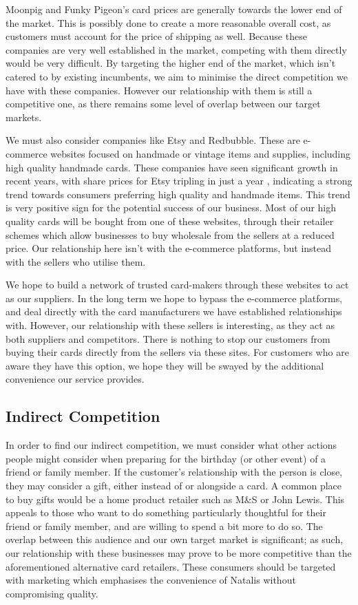 \documentclass[10pt,a4paper]{article}
\begin{document}
Moonpig and Funky Pigeon's card prices are generally towards the lower end of the market. This is possibly done to create a more reasonable overall cost, as customers must account for the price of shipping as well. Because these companies are very well established in the market, competing with them directly would be very difficult. By targeting the higher end of the market, which isn't catered to by existing incumbents, we aim to minimise the direct competition we have with these companies. However our relationship with them is still a competitive one, as there remains some level of overlap between our target markets.

We must also consider companies like Etsy and Redbubble. These are e-commerce websites focused on handmade or vintage items and supplies, including high quality handmade cards. These companies have seen significant growth in recent years, with share prices for Etsy tripling in just a year \cite{etsyshares}, indicating a strong trend towards consumers preferring high quality and handmade items. This trend is very positive sign for the potential success of our business. Most of our high quality cards will be bought from one of these websites, through their retailer schemes which allow businesses to buy wholesale from the sellers at a reduced price. Our relationship here isn't with the e-commerce platforms, but instead with the sellers who utilise them.

We hope to build a network of trusted card-makers through these websites to act as our suppliers. In the long term we hope to bypass the e-commerce platforms, and deal directly with the card manufacturers we have established relationships with. However, our relationship with these sellers is interesting, as they act as both suppliers and competitors. There is nothing to stop our customers from buying their cards directly from the sellers via these sites. For customers who are aware they have this option, we hope they will be swayed by the additional convenience our service provides.

\subsection*{Indirect Competition}

In order to find our indirect competition, we must consider what other actions people might consider when preparing for the birthday (or other event) of a friend or family member. If the customer's relationship with the person is close, they may consider a gift, either instead of or alongside a card. A common place to buy gifts would be a home product retailer such as M\&S or John Lewis. This appeals to those who want to do something particularly thoughtful for their friend or family member, and are willing to spend a bit more to do so. The overlap between this audience and our own target market is significant; as such, our relationship with these businesses may prove to be more competitive than the aforementioned alternative card retailers. These consumers should be targeted with marketing which emphasises the convenience of Natalis without compromising quality.
\end{document}

